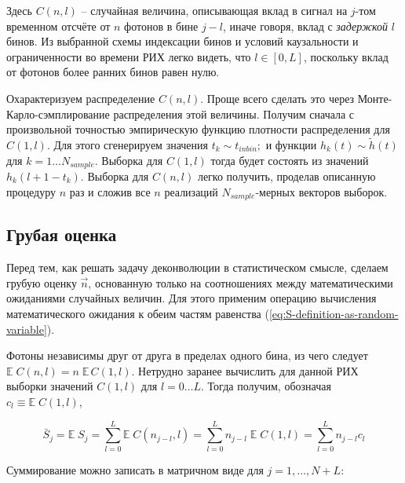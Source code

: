 Здесь $C(n, l)$ -- случайная величина, описывающая вклад в сигнал на $j$-том временном отсчёте от $n$ фотонов в бине $j - l$, иначе говоря, вклад с \textit{задержкой} $l$ бинов. Из выбранной схемы индексации бинов и условий каузальности и ограниченности во времени РИХ легко видеть, что $l \in \left[0, L\right]$, поскольку вклад от фотонов более ранних бинов равен нулю.

Охарактеризуем распределение $C(n, l)$. Проще всего сделать это через Монте-Карло-сэмплирование распределения этой величины. Получим сначала с произвольной точностью эмпирическую функцию плотности распределения для $C(1, l)$. Для этого сгенерируем значения $t_k \sim t_{inbin};$ и функции $h_k(t) \sim \tilde{h}(t)$ для $k = 1 \ldots N_{sample}$. Выборка для $C(1, l)$ тогда будет состоять из значений $h_k(l + 1 - t_k)$. Выборка для $C(n, l)$ легко получить, проделав описанную процедуру $n$ раз и сложив все $n$ реализаций $N_{sample}$-мерных векторов выборок.

\subsection{Грубая оценка}
\label{sec:rough-estimation}

Перед тем, как решать задачу деконволюции в статистическом смысле, сделаем грубую оценку $\vec{n}$, основанную только на соотношениях между математическими ожиданиями случайных величин. Для этого применим операцию вычисления математического ожидания к обеим частям равенства (\ref{eq:S-definition-as-random-variable}).

Фотоны независимы друг от друга в пределах одного бина, из чего следует $ \mathbb{E} \; C(n, l) = n \; \mathbb{E} \, C(1, l)$. Нетрудно заранее вычислить для данной РИХ выборки значений $C(1, l)$ для $l = 0 \ldots L$. Тогда получим, обозначая $c_l \equiv \mathbb{E} \; C(1, l)$,

\begin{equation}
	\bar{S}_j = \mathbb{E} \; S_j = \sum_{l=0}^{L} \mathbb{E} \; C(n_{j-l}, l) = \sum_{l=0}^{L} n_{j-l} \; \mathbb{E} \; C(1, l) = \sum_{l=0}^{L} n_{j-l} c_l
\end{equation}

Суммирование можно записать в матричном виде для $j = 1, \ldots, N + L$:


